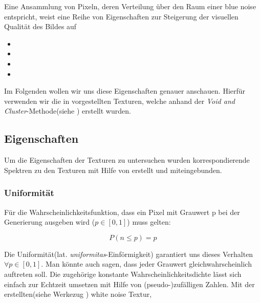 Eine Ansammlung von Pixeln, deren Verteilung über den Raum einer blue noise entspricht, 
weist eine Reihe von Eigenschaften zur Steigerung der visuellen Qualität des Bildes auf \cite{3288}

\begin{itemize}

    \item {}
    \item {}
    \item {}
    \item {}

\end{itemize}

Im Folgenden wollen wir uns diese Eigenschaften genauer anschauen.
Hierfür verwenden wir die in \cite{Pet17} vorgestellten Texturen, welche anhand der
\textit{Void and Cluster}-Methode(siehe \cite{ulichney1993void}) erstellt wurden.

\subsection{Eigenschaften}

Um die Eigenschaften der Texturen zu untersuchen wurden korrespondierende Spektren zu den Texturen mit Hilfe von 
\cite{JCrystalSoft2018} erstellt und miteingebunden.

\subsubsection{Uniformität}
\label{ch:Content1:sec:blue noise:Uniformität}

Für die Wahrscheinlichkeitsfunktion, dass
ein Pixel mit Grauwert p bei der Generierung ausgeben wird  ($\textit{p} \in [0,1]$) muss gelten: 

\begin{equation}\label{eq:Uniformitätsgleichung}
    P(n \leq p) = p
\end{equation}

Die Uniformität(lat. \textit{uniformitas}-Einförmigkeit) garantiert uns dieses
Verhalten $\forall p \in [0,1]$. Man könnte auch sagen, dass jeder Grauwert gleichwahrscheinlich
auftreten soll. Die zugehörige konstante Wahrscheinlichkeitsdichte
lässt sich einfach zur Echtzeit umsetzen mit Hilfe von (pseudo-)zufälligen Zahlen.
Mit der erstellten(siehe Werkezug \cite{WhiteNoiseGenerator}) white noise Textur,

